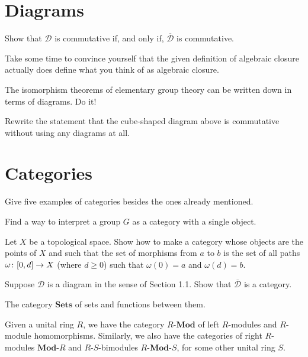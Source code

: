 \section{Diagrams}

\bx
Show that $\mathcal{D}$ is commutative if, and only if, $\overline{\mathcal{D}}$ is commutative.
\ex

\bs
\es

\bx
\ben[label=(\alph*)]
\item Take some time to convince yourself that the given definition of algebraic closure actually does define what you think of as algebraic closure.
\item The isomorphism theorems of elementary group theory can be written down in terms of diagrams. Do it!
\item Rewrite the statement that the cube-shaped diagram above is commutative without using any diagrams at all.
\een
\ex

\bs
\ben[label=(\alph*)]
\item
\item
\item
\een
\es

\section{Categories}

\bx
\ben[label=(\alph*)]
\item Give five examples of categories besides the ones already mentioned.
\item Find a way to interpret a group $G$ as a category with a single object.
\item Let $X$ be a topological space. Show how to make a category whose objects are the points of $X$ and such that the set of morphisms from $a$ to $b$ is the set of all paths $\omega \colon [0, d] \to X$ (where $d \geq 0$) such that $\omega(0) = a$ and $\omega(d) = b$.
\item Suppose $\mathcal{D}$ is a diagram in the sense of Section 1.1. Show that $\overline{\mathcal{D}}$ is a category.
\een
\ex

\bs
\ben[label=(\alph*)]
\item 
\ben[label=(\roman*)]
\item The category $\mathbf{Sets}$ of sets and functions between them.
\item Given a unital ring $R$, we have the category $R$-$\mathbf{Mod}$ of left $R$-modules and $R$-module homomorphisms. Similarly, we also have the categories of right $R$-modules $\mathbf{Mod}$-$R$ and $R$-$S$-bimodules $R$-$\mathbf{Mod}$-$S$, for some other unital ring $S$.

